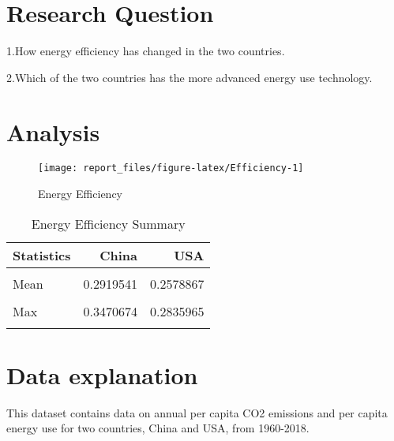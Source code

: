 \documentclass[11pt,a4paper,]{article}
\begin{document}
\hypertarget{research-question-2}{%
\section{Research Question}\label{research-question-2}}

1.How energy efficiency has changed in the two countries.

2.Which of the two countries has the more advanced energy use technology.

\hypertarget{analysis}{%
\section{Analysis}\label{analysis}}

\begin{figure}[H]

{\centering \texttt{[image: report\_files/figure-latex/Efficiency-1]} 

}

\caption{Energy Efficiency}\label{fig:Efficiency}
\end{figure}

\begin{table}[!h]

\caption{\label{tab:advanced}Energy Efficiency Summary}
\centering
\begin{tabular}[t]{lrr}
\toprule
Statistics & China & USA\\
\midrule
\cellcolor{gray!6}{Min} & \cellcolor{gray!6}{0.2241698} & \cellcolor{gray!6}{0.2363787}\\
Mean & 0.2919541 & 0.2578867\\
\cellcolor{gray!6}{Median} & \cellcolor{gray!6}{0.3007386} & \cellcolor{gray!6}{0.2538690}\\
Max & 0.3470674 & 0.2835965\\
\cellcolor{gray!6}{Growth} & \cellcolor{gray!6}{54.8234374} & \cellcolor{gray!6}{19.9755030}\\
\bottomrule
\end{tabular}
\end{table}

\hypertarget{data-explanation-2}{%
\section{Data explanation}\label{data-explanation-2}}

This dataset contains data on annual per capita CO2 emissions and per capita energy use for two countries, China and USA, from 1960-2018.
\end{document}
